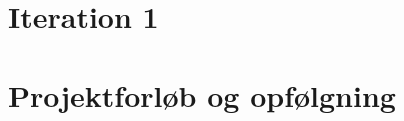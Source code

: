 
\raggedbottom









\cleardoublepage %
\tableofcontents*







\part{Iteration 1}


%

\part{Projektforløb og opfølgning}

















